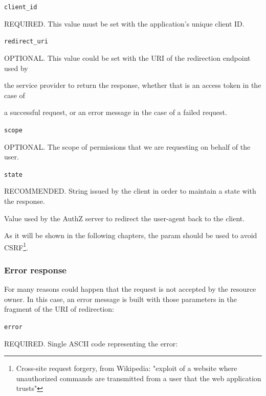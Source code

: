 \texttt{client\_id}

\hspace{0.5cm}REQUIRED. This value must be set with the application's unique client ID.

\texttt{redirect\_uri}

\hspace{0.5cm}OPTIONAL. This value could be set with the URI of the redirection endpoint used by 

\hspace{0.5cm}the service provider to return the response, whether that is an access token in the case of

\hspace{0.5cm} a successful request, or an error message in the case of a failed request.

\texttt{scope}

\hspace{0.5cm}OPTIONAL. The scope of permissions that we are requesting on behalf of the user.

\vspace{0.5cm}

\texttt{state}

\hspace{0.5cm}RECOMMENDED. String issued by the client in order to maintain a state with the response.

\hspace{0.5cm}Value used by the AuthZ server to redirect the user-agent back to the client.

\hspace{0.5cm}As it will be shown in the following chapters, the param should be used to avoid CSRF\footnote{Cross-site request forgery, from Wikipedia: "exploit of a website where unauthorized commands are transmitted from a user that the web application trusts"}.

\subsubsection{Error response}
\label{tokenerr}
For many reasons could happen that the request is not accepted by the resource owner. In this case, an error message is built with those parameters in the fragment of the URI of redirection:

\texttt{error}

\hspace{0.5cm}REQUIRED. Single ASCII code representing the error:


